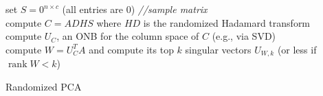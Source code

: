 \begin{algorithm}
\SetAlgoLined
{}
 \BlankLine
 set $S = 0^{n \times c}$ (all entries are $0$) \textit{//sample matrix}\\
compute $C=ADHS$ where $HD$ is the randomized Hadamard transform\\
compute $U_C$, an ONB for the column space of $C$ (e.g., via SVD)\\
compute $W=U_C^TA$ and compute its top $k$ singular vectors $U_{W,k}$ (or less if $\operatorname{rank} W <k$) \\
\caption{Randomized PCA} \label{algo:random-pca}
\end{algorithm}
\newpage
